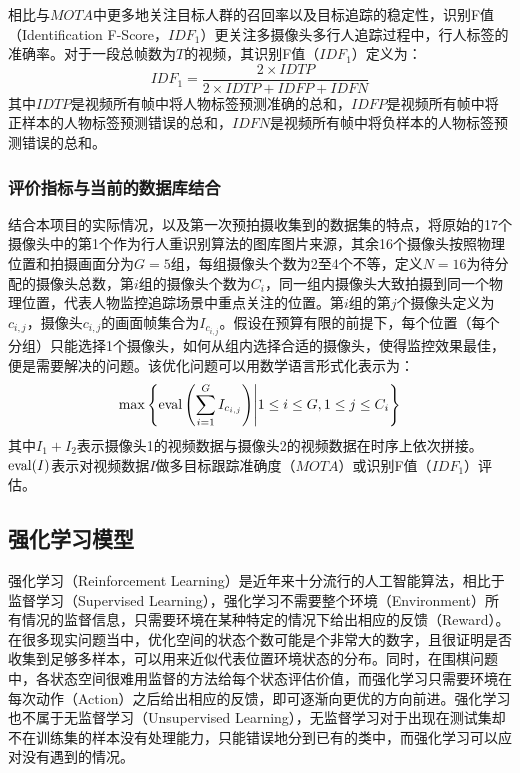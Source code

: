 相比与$\mathit{MOTA}$中更多地关注目标人群的召回率以及目标追踪的稳定性，识别F值（Identification F-Score，$\mathit{IDF_1}$）更关注多摄像头多行人追踪过程中，行人标签的准确率。对于一段总帧数为$T$的视频，其识别F值（$\mathit{IDF_1}$）定义为：
\begin{equation}
\mathit{IDF_1}=\frac{2\times\mathit{IDTP}}{2\times\mathit{IDTP}+\mathit{IDFP}+\mathit{IDFN}}
\end{equation}
其中$\mathit{IDTP}$是视频所有帧中将人物标签预测准确的总和，$\mathit{IDFP}$是视频所有帧中将正样本的人物标签预测错误的总和，$\mathit{IDFN}$是视频所有帧中将负样本的人物标签预测错误的总和。

\subsubsection{评价指标与当前的数据库结合}

结合本项目的实际情况，以及第一次预拍摄收集到的数据集的特点，将原始的17个摄像头中的第1个作为行人重识别算法的图库图片来源，其余16个摄像头按照物理位置和拍摄画面分为$G=5$组，每组摄像头个数为2至4个不等，定义$N=16$为待分配的摄像头总数，第$i$组的摄像头个数为$C_i$，同一组内摄像头大致拍摄到同一个物理位置，代表人物监控追踪场景中重点关注的位置。第$i$组的第$j$个摄像头定义为$c_{i,j}$，摄像头$c_{i,j}$的画面帧集合为$I_{c_{i,j}}$。假设在预算有限的前提下，每个位置（每个分组）只能选择1个摄像头，如何从组内选择合适的摄像头，使得监控效果最佳，便是需要解决的问题。该优化问题可以用数学语言形式化表示为：
\begin{equation}
\max \left\{\mathop{\rm eval}\left(\sum_{i=1}^G I_{c_{i,j}}\right)\middle\vert 1\leq i \leq G, 1\leq j \leq C_i\right\}
\end{equation}
其中$I_1+I_2$表示摄像头1的视频数据与摄像头2的视频数据在时序上依次拼接。$\mathop{\rm eval}(I)$表示对视频数据$I$做多目标跟踪准确度（$\mathit{MOTA}$）或识别F值（$\mathit{IDF_1}$）评估。

\subsection{强化学习模型}

强化学习（Reinforcement Learning）是近年来十分流行的人工智能算法，相比于监督学习（Supervised Learning），强化学习不需要整个环境（Environment）所有情况的监督信息，只需要环境在某种特定的情况下给出相应的反馈（Reward）。在很多现实问题当中，优化空间的状态个数可能是个非常大的数字，且很证明是否收集到足够多样本，可以用来近似代表位置环境状态的分布。同时，在围棋问题中\cite{silver2016mastering}，各状态空间很难用监督的方法给每个状态评估价值，而强化学习只需要环境在每次动作（Action）之后给出相应的反馈，即可逐渐向更优的方向前进。强化学习也不属于无监督学习（Unsupervised Learning），无监督学习对于出现在测试集却不在训练集的样本没有处理能力，只能错误地分到已有的类中，而强化学习可以应对没有遇到的情况。

